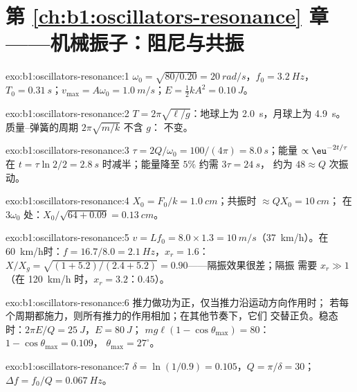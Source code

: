 \section*{第 \ref{ch:b1:oscillators-resonance} 章——机械振子：阻尼与共振}

\begin{solution}{exo:b1:oscillators-resonance:1}
$\omega_0 = \sqrt{80/0.20} = \qty{20}{rad/s}$，$f_0 = \qty{3.2}{Hz}$，$T_0 =
\qty{0.31}{s}$；$v_{\max} = A\omega_0 = \qty{1.0}{m/s}$；$E = \tfrac12 kA^2 =
\qty{0.10}{J}$。
\end{solution}

\begin{solution}{exo:b1:oscillators-resonance:2}
$T = 2\pi\sqrt{\ell/g}$：地球上为 \qty{2.0}{s}，月球上为 \qty{4.9}{s}。
质量–弹簧的周期 $2\pi\sqrt{m/k}$ 不含 $g$：
不变。
\end{solution}

\begin{solution}{exo:b1:oscillators-resonance:3}
$\tau = 2Q/\omega_0 = 100/(4\pi) = \qty{8.0}{s}$；能量 $\propto \eu^{-2t/\tau}$
在 $t = \tau\ln2/2 = \qty{2.8}{s}$ 时减半；能量降至 $5\%$ 约需 $3\tau = \qty{24}{s}$，
约为 $48 \approx Q$ 次振动。
\end{solution}

\begin{solution}{exo:b1:oscillators-resonance:4}
$X_0 = F_0/k = \qty{1.0}{cm}$；共振时 $\approx QX_0 = \qty{10}{cm}$；
在 $3\omega_0$ 处：$X_0/\sqrt{64 + 0.09} = \qty{0.13}{cm}$。
\end{solution}

\begin{solution}{exo:b1:oscillators-resonance:5}
$v = Lf_0 = 8.0 \times 1.3 = \qty{10}{m/s}$（\qty{37}{km/h}）。在
\qty{60}{km/h}时：$f = 16.7/8.0 = \qty{2.1}{Hz}$，$x_r = 1.6$：$X/X_g =
\sqrt{(1 + 5.2)/(2.4 + 5.2)} = 0.90$——隔振效果很差；隔振
需要 $x_r \gg 1$（在 \qty{120}{km/h} 时，$x_r = 3.2$：$0.45$）。
\end{solution}

\begin{solution}{exo:b1:oscillators-resonance:6}
推力做功为正，仅当推力沿运动方向作用时；
若每个周期都施力，则所有推力的作用相加；在其他节奏下，它们
交替正负。稳态时：$2\pi E/Q = \qty{25}{J}$，$E = \qty{80}{J}$；
$mg\ell(1 - \cos\theta_{\max}) = 80$：$1 - \cos\theta_{\max} = 0.109$，
$\theta_{\max} = 27^\circ$。
\end{solution}

\begin{solution}{exo:b1:oscillators-resonance:7}
$\delta = \ln(1/0.9) = 0.105$，$Q = \pi/\delta = 30$；$\Delta f = f_0/Q =
\qty{0.067}{Hz}$。
\end{solution}

